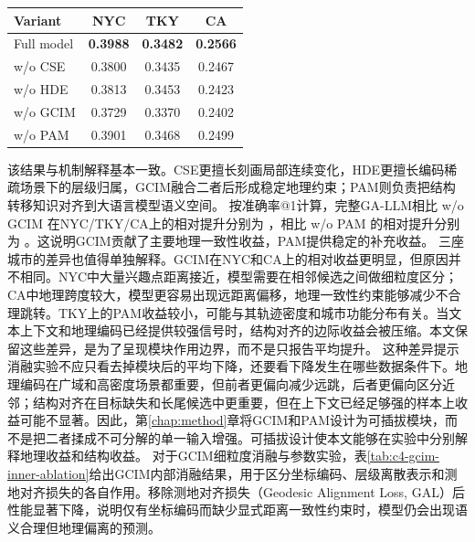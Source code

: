 \begin{table}[htbp]
    \tblstyle
    \label{tab:c4-gallm-ablation}
    \begin{tabular}{lccc}
        \toprule
        Variant & NYC & TKY & CA \\
        \midrule
        Full model & \textbf{0.3988} & \textbf{0.3482} & \textbf{0.2566} \\
        w/o CSE & 0.3800 & 0.3435 & 0.2467 \\
        w/o HDE & 0.3813 & 0.3453 & 0.2423 \\
        w/o GCIM & 0.3729 & 0.3370 & 0.2402 \\
        w/o PAM & 0.3901 & 0.3468 & 0.2499 \\
        \bottomrule
    \end{tabular}
\end{table}

该结果与机制解释基本一致。CSE更擅长刻画局部连续变化，HDE更擅长编码稀疏场景下的层级归属，GCIM融合二者后形成稳定地理约束；PAM则负责把结构转移知识对齐到大语言模型语义空间。
按准确率@1计算，完整GA-LLM相比 w/o GCIM 在NYC/TKY/CA上的相对提升分别为 ，相比 w/o PAM 的相对提升分别为 。这说明GCIM贡献了主要地理一致性收益，PAM提供稳定的补充收益。
三座城市的差异也值得单独解释。GCIM在NYC和CA上的相对收益更明显，但原因并不相同。NYC中大量兴趣点距离接近，模型需要在相邻候选之间做细粒度区分；CA中地理跨度较大，模型更容易出现远距离偏移，地理一致性约束能够减少不合理跳转。TKY上的PAM收益较小，可能与其轨迹密度和城市功能分布有关。当文本上下文和地理编码已经提供较强信号时，结构对齐的边际收益会被压缩。本文保留这些差异，是为了呈现模块作用边界，而不是只报告平均提升。
这种差异提示消融实验不应只看去掉模块后的平均下降，还要看下降发生在哪些数据条件下。地理编码在广域和高密度场景都重要，但前者更偏向减少远跳，后者更偏向区分近邻；结构对齐在目标缺失和长尾候选中更重要，但在上下文已经足够强的样本上收益可能不显著。因此，第\ref{chap:method}章将GCIM和PAM设计为可插拔模块，而不是把二者揉成不可分解的单一输入增强。可插拔设计使本文能够在实验中分别解释地理收益和结构收益。
对于GCIM细粒度消融与参数实验，表\ref{tab:c4-gcim-inner-ablation}给出GCIM内部消融结果，用于区分坐标编码、层级离散表示和测地对齐损失的各自作用。移除测地对齐损失（Geodesic Alignment Loss, GAL）后性能显著下降，说明仅有坐标编码而缺少显式距离一致性约束时，模型仍会出现语义合理但地理偏离的预测。

